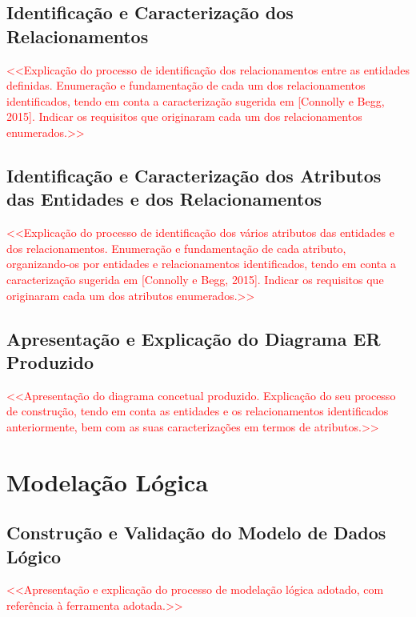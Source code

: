 \documentclass[a4paper,12pt]{scrreprt}
\begin{document}
    \section{Identificação e Caracterização dos Relacionamentos}
        \textcolor{red}{
            <<Explicação do processo de identificação dos relacionamentos entre as entidades definidas. Enumeração e fundamentação de cada um dos relacionamentos identificados, tendo em conta a caracterização sugerida em [Connolly e Begg, 2015]. Indicar os requisitos que originaram cada um dos relacionamentos enumerados.>>
        }
    \section{Identificação e Caracterização dos Atributos das Entidades e dos Relacionamentos}
        \textcolor{red}{
            <<Explicação do processo de identificação dos vários atributos das entidades e dos relacionamentos. Enumeração e fundamentação de cada atributo, organizando-os por entidades e relacionamentos identificados, tendo em conta a caracterização sugerida em [Connolly e Begg, 2015]. Indicar os requisitos que originaram cada um dos atributos enumerados.>>
        }
    \section{Apresentação e Explicação do Diagrama ER Produzido}
        \textcolor{red}{
            <<Apresentação do diagrama concetual produzido. Explicação do seu processo de construção, tendo em conta as entidades e os relacionamentos identificados anteriormente, bem com as suas caracterizações em termos de atributos.>>
        }



\chapter{Modelação Lógica}
    \section{Construção e Validação do Modelo de Dados Lógico}
        \textcolor{red}{
            <<Apresentação e explicação do processo de modelação lógica adotado, com referência à ferramenta adotada.>>
        }
\end{document}
